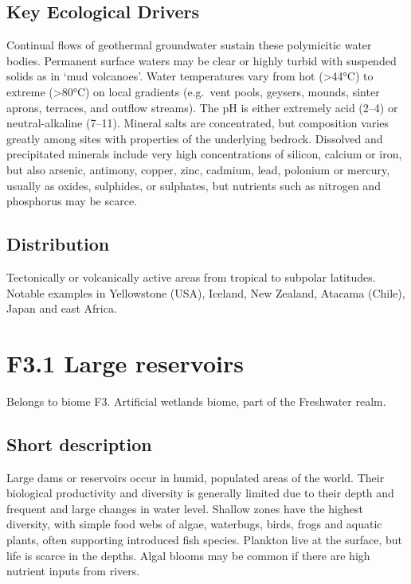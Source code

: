 \documentclass[
  letterpaper,
  DIV=11,
  numbers=noendperiod]{scrartcl}
\begin{document}
\subsection{Key Ecological Drivers}\label{key-ecological-drivers-125}

Continual flows of geothermal groundwater sustain these polymicitic
water bodies. Permanent surface waters may be clear or highly turbid
with suspended solids as in `mud volcanoes'. Water temperatures vary
from hot (\textgreater44°C) to extreme (\textgreater80°C) on local
gradients (e.g.~vent pools, geysers, mounds, sinter aprons, terraces,
and outflow streams). The pH is either extremely acid (2--4) or
neutral-alkaline (7--11). Mineral salts are concentrated, but
composition varies greatly among sites with properties of the underlying
bedrock. Dissolved and precipitated minerals include very high
concentrations of silicon, calcium or iron, but also arsenic, antimony,
copper, zinc, cadmium, lead, polonium or mercury, usually as oxides,
sulphides, or sulphates, but nutrients such as nitrogen and phosphorus
may be scarce.

\subsection{Distribution}\label{distribution-125}

Tectonically or volcanically active areas from tropical to subpolar
latitudes. Notable examples in Yellowstone (USA), Iceland, New Zealand,
Atacama (Chile), Japan and east Africa.

\section{F3.1 Large reservoirs}\label{f3.1-large-reservoirs-1}

Belongs to biome F3. Artificial wetlands biome, part of the Freshwater
realm.

\subsection{Short description}\label{short-description-126}

Large dams or reservoirs occur in humid, populated areas of the world.
Their biological productivity and diversity is generally limited due to
their depth and frequent and large changes in water level. Shallow zones
have the highest diversity, with simple food webs of algae, waterbugs,
birds, frogs and aquatic plants, often supporting introduced fish
species. Plankton live at the surface, but life is scarce in the depths.
Algal blooms may be common if there are high nutrient inputs from
rivers.
\end{document}
